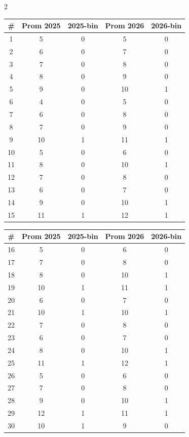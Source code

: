 \documentclass[12pt]{article}
\begin{document}
	\begin{multicols}{2}
		\begin{center}
			\scriptsize
			\begin{tabular}{|c|c|c|c|c|}
				\hline
				\textbf{\#} & \textbf{Prom 2025} & \textbf{2025-bin} & \textbf{Prom 2026} & \textbf{2026-bin} \\
				\hline
				1 & 5 & 0 & 5 & 0 \\
				2 & 6 & 0 & 7 & 0 \\
				3 & 7 & 0 & 8 & 0 \\
				4 & 8 & 0 & 9 & 0 \\
				5 & 9 & 0 & 10 & 1 \\
				6 & 4 & 0 & 5 & 0 \\
				7 & 6 & 0 & 8 & 0 \\
				8 & 7 & 0 & 9 & 0 \\
				9 & 10 & 1 & 11 & 1 \\
				10 & 5 & 0 & 6 & 0 \\
				11 & 8 & 0 & 10 & 1 \\
				12 & 7 & 0 & 8 & 0 \\
				13 & 6 & 0 & 7 & 0 \\
				14 & 9 & 0 & 10 & 1 \\
				15 & 11 & 1 & 12 & 1 \\
				\hline
			\end{tabular}
		\end{center}
		
		\columnbreak
		
		\begin{center}
			\scriptsize
			\begin{tabular}{|c|c|c|c|c|}
				\hline
				\textbf{\#} & \textbf{Prom 2025} & \textbf{2025-bin} & \textbf{Prom 2026} & \textbf{2026-bin} \\
				\hline
				16 & 5 & 0 & 6 & 0 \\
				17 & 7 & 0 & 8 & 0 \\
				18 & 8 & 0 & 10 & 1 \\
				19 & 10 & 1 & 11 & 1 \\
				20 & 6 & 0 & 7 & 0 \\
				21 & 10 & 1 & 10 & 1 \\
				22 & 7 & 0 & 8 & 0 \\
				23 & 6 & 0 & 7 & 0 \\
				24 & 8 & 0 & 10 & 1 \\
				25 & 11 & 1 & 12 & 1 \\
				26 & 5 & 0 & 6 & 0 \\
				27 & 7 & 0 & 8 & 0 \\
				28 & 9 & 0 & 10 & 1 \\
				29 & 12 & 1 & 11 & 1 \\
				30 & 10 & 1 & 9 & 0 \\
				\hline
			\end{tabular}
		\end{center}
	\end{multicols}
	
\end{document}
